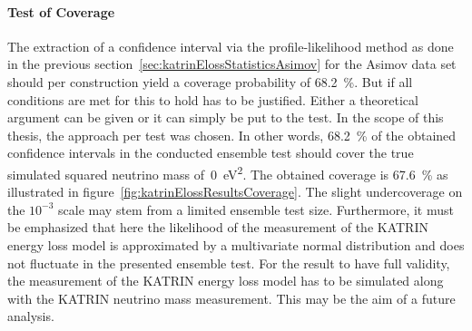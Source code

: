 \paragraph{Test of Coverage}
The extraction of a confidence interval via the profile-likelihood method as done in the previous section~\ref{sec:katrinElossStatisticsAsimov} for the Asimov data set should per construction yield a coverage probability of \SI{68.2}{\percent}. But if all conditions are met for this to hold has to be justified. Either a theoretical argument can be given or it can simply be put to the test. In the scope of this thesis, the approach per test was chosen. In other words, \SI{68.2}{\percent} of the obtained confidence intervals in the conducted ensemble test should cover the true simulated squared neutrino mass of~\SI{0}{eV^2}. The obtained coverage is \SI{67.6}{\percent} as illustrated in figure~\ref{fig:katrinElossResultsCoverage}. The slight undercoverage on the $10^{-3}$ scale may stem from a limited ensemble test size. Furthermore, it must be emphasized that here the likelihood of the measurement of the KATRIN energy loss model is approximated by a multivariate normal distribution and does not fluctuate in the presented ensemble test. For the result to have full validity, the measurement of the KATRIN energy loss model has to be simulated along with the KATRIN neutrino mass measurement. This may be the aim of a future analysis.

